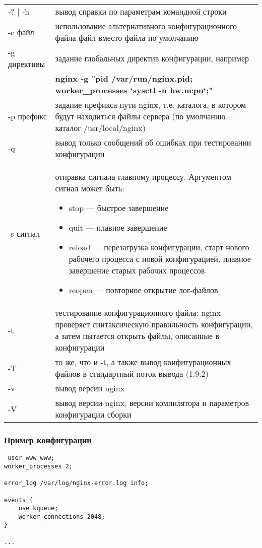 \documentclass[a4paper,10pt,twoside]{article}
\begin{document}
\begin{longtable}{  m{5cm}  m{10cm}  }  
-? | -h & вывод справки по параметрам командной строки\\
-c файл & использование альтернативного конфигурационного файла файл вместо файла по умолчанию\\
-g директивы & задание глобальных директив конфигурации, например\\
 & \textbf{nginx -g "pid /var/run/nginx.pid; worker_processes `sysctl -n hw.ncpu`;"}\\
-p префикс & задание префикса пути nginx, т.е. каталога, в котором будут находиться файлы сервера (по умолчанию — каталог /usr/local/nginx)\\
-q & вывод только сообщений об ошибках при тестировании конфигурации\\
-s сигнал & отправка сигнала главному процессу. Аргументом сигнал может быть:
\begin{itemize}
 \item stop — быстрое завершение
\item quit — плавное завершение
\item reload — перезагрузка конфигурации, старт нового рабочего процесса с новой конфигурацией, плавное завершение старых рабочих процессов.
\item reopen — повторное открытие лог-файлов
\end{itemize}\\
-t & тестирование конфигурационного файла: nginx проверяет синтаксическую правильность конфигурации, а затем пытается открыть файлы, описанные в конфигурации\\
-T & то же, что и -t, а также вывод конфигурационных файлов в стандартный поток вывода (1.9.2)\\
-v & вывод версии nginx\\
-V & вывод версии nginx, версии компилятора и параметров конфигурации сборки\\
\end{longtable}


\subsubsection{Пример конфигурации}
\begin{verbatim}
 user www www;
worker_processes 2;

error_log /var/log/nginx-error.log info;

events {
    use kqueue;
    worker_connections 2048;
}

...
\end{verbatim}
\end{document}
